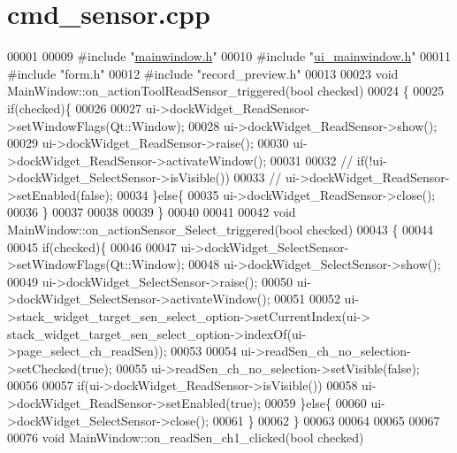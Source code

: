\hypertarget{a00085_source}{\section{cmd\+\_\+sensor.\+cpp}
\label{a00085_source}
}

\begin{DoxyCode}
00001 
00009 \textcolor{preprocessor}{#include "\hyperlink{a00110}{mainwindow.h}"}
00010 \textcolor{preprocessor}{#include "\hyperlink{a00139}{ui\_mainwindow.h}"}
00011 \textcolor{preprocessor}{#include "form.h"}
00012 \textcolor{preprocessor}{#include "record\_preview.h"}
00013 
00023 \textcolor{keywordtype}{void} MainWindow::on\_actionToolReadSensor\_triggered(\textcolor{keywordtype}{bool} checked)
00024 \{
00025     \textcolor{keywordflow}{if}(checked)\{
00026 
00027         ui->dockWidget\_ReadSensor->setWindowFlags(Qt::Window);
00028         ui->dockWidget\_ReadSensor->show();
00029         ui->dockWidget\_ReadSensor->raise();
00030         ui->dockWidget\_ReadSensor->activateWindow();
00031 
00032       \textcolor{comment}{//  if(!ui->dockWidget\_SelectSensor->isVisible())}
00033            \textcolor{comment}{// ui->dockWidget\_ReadSensor->setEnabled(false);}
00034     \}\textcolor{keywordflow}{else}\{
00035         ui->dockWidget\_ReadSensor->close();
00036     \}
00037 
00038 
00039 \}
00040 
00041 
00042 \textcolor{keywordtype}{void} MainWindow::on\_actionSensor\_Select\_triggered(\textcolor{keywordtype}{bool} checked)
00043 \{
00044 
00045     \textcolor{keywordflow}{if}(checked)\{
00046 
00047         ui->dockWidget\_SelectSensor->setWindowFlags(Qt::Window);
00048         ui->dockWidget\_SelectSensor->show();
00049         ui->dockWidget\_SelectSensor->raise();
00050         ui->dockWidget\_SelectSensor->activateWindow();
00051 
00052         ui->stack\_widget\_target\_sen\_select\_option->setCurrentIndex(ui->
      stack\_widget\_target\_sen\_select\_option->indexOf(ui->page\_select\_ch\_readSen));
00053 
00054         ui->readSen\_ch\_no\_selection->setChecked(\textcolor{keyword}{true});
00055         ui->readSen\_ch\_no\_selection->setVisible(\textcolor{keyword}{false});
00056 
00057         \textcolor{keywordflow}{if}(ui->dockWidget\_ReadSensor->isVisible())
00058             ui->dockWidget\_ReadSensor->setEnabled(\textcolor{keyword}{true});
00059     \}\textcolor{keywordflow}{else}\{
00060         ui->dockWidget\_SelectSensor->close();
00061     \}
00062 \}
00063 
00064 
00065 
00067 
00076 \textcolor{keywordtype}{void} MainWindow::on\_readSen\_ch1\_clicked(\textcolor{keywordtype}{bool} checked)

\end{DoxyCode}
